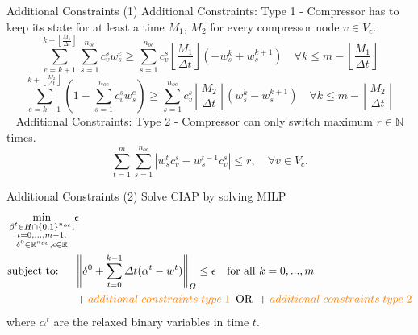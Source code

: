 \documentclass[8pt]{beamer}
\newcommand\Fontvi{\fontsize{6}{7.2}\selectfont}
\newcommand{\norm}[1]{\left\lVert#1\right\rVert} %
\begin{document}
\begin{frame}{Additional Constraints (1)}
\textcolor{bluepurp}{Additional Constraints: Type 1} - Compressor has to keep its state for at least a time $M_1$, $M_2$ for every compressor node $v \in V_c$.  
\begin{equation}
\sum_{e=k+1}^{k+\left\lfloor\frac{M_{1}}{\Delta t}\right\rfloor} \sum_{s=1}^{n_{oc}} c_{v}^{s} w_{s}^e\geq \sum_{s=1}^{n_{oc}} c_{v}^{s}\left\lfloor \frac{M_{1}}{\Delta t}\right\rfloor\left(-w_{s}^k+w_{s}^{k+1}\right) \quad \forall k \leq m - \left\lfloor\frac{M_{1}}{\Delta t}\right\rfloor
\label{EqAdd:6.10}
\end{equation}
\begin{equation}
\sum_{e=k+1}^{k+\left\lfloor\frac{M_{2}}{\Delta t}\right\rfloor}\left(1-\sum_{s=1}^{n_{oc}} c_{v}^{s} w_{s}^e\right) \geq \sum_{s=1}^{n_{oc}} c_{v}^{s}\left\lfloor\frac{M_{2}}{\Delta t}\right\rfloor\left(w_{s}^k-w_{s}^{k+1}\right) \quad \forall k \leq m - \left\lfloor\frac{M_{2}}{\Delta t}\right\rfloor
\label{Eq:6.11}
\end{equation}
\ \newline\newline
\textcolor{bluepurp}{Additional Constraints: Type 2} - Compressor can only switch maximum $r\in \mathbb{N}$ times.
\begin{equation}
\sum_{t=1}^m \sum_{s=1}^{n_{oc}} |w_{s}^t c_v^s - w_{s}^{t-1} c_v^s | \leq r, \quad \forall v \in V_c.
\label{Eq:6.11b}
\end{equation}
\end{frame}
\begin{frame}{Additional Constraints (2)}
\textcolor{bluepurp}{Solve CIAP by solving MILP}
\begin{alignat}{1}
\begin{split}
\min_{\substack{\beta^t \in H \cap \{0,1\}^{n_{oc}},  \\ t =0,...,m-1,  \\ \delta^0 \in \mathbb{R}^{n_{oc}}, \epsilon \in \mathbb{R}}}  &\epsilon      \\
\text{subject to: } \quad &\norm{\delta^0 + \sum_{t=0}^{k-1} \Delta t (\alpha^t-w^t)}_{\Omega} \leq \epsilon \quad  \text{for all } k=0,...,m \\
& + \textcolor{orange}{additional \; constraints \; type \; 1 \, }  \text{ OR } + \textcolor{orange}{additional \; constraints \; type \; 2}
\end{split}
\label{Eq:CIAP_MILP}
\end{alignat}
where $\alpha^t$ are the relaxed binary variables in time $t$.
\end{frame}
\end{document}
